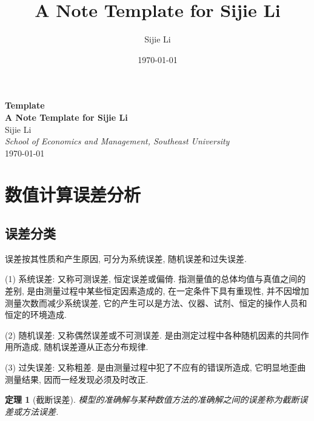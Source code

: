 \documentclass[12pt,a4paper,twoside,UTF8]{ctexart}
\title{A Note Template for Sijie Li}
\author{Sijie Li}
\affil{Department of Logistics Management and Engineering, Southeast University}
\date{\today}
\newtheorem{theorem}{定理}
\begin{document}
    \maketitle

    \newpage
    \begin{titlepage}
    \begin{center}
      {\huge \bf Template \\[1ex]
                      A Note Template for Sijie Li}                  \\[6.5ex]
      {\large Sijie Li}           \\
      \vspace{15cm}
      \textit{School of Economics and Management, Southeast University}                \\[2ex]
      \vfill
      \today
    \end{center}
    \end{titlepage}

    \thispagestyle{empty}
    \newpage
    \tableofcontents %

    \newpage
    \section{数值计算误差分析}
    \subsection{误差分类}
    误差按其性质和产生原因, 可分为系统误差, 随机误差和过失误差.

    (1) 系统误差: 又称可测误差, 恒定误差或偏倚. 指测量值的总体均值与真值之间的差别, 是由测量过程中某些恒定因素造成的, 在一定条件下具有重现性, 并不因增加测量次数而减少系统误差, 它的产生可以是方法、仪器、试剂、恒定的操作人员和恒定的环境造成.

    (2) 随机误差: 又称偶然误差或不可测误差. 是由测定过程中各种随机因素的共同作用所造成, 随机误差遵从正态分布规律.

    (3) 过失误差: 又称粗差. 是由测量过程中犯了不应有的错误所造成, 它明显地歪曲测量结果, 因而一经发现必须及时改正.

    \begin{theorem}[截断误差]
    模型的准确解与某种数值方法的准确解之间的误差称为截断误差或方法误差.
    \end{theorem}
\end{document}
